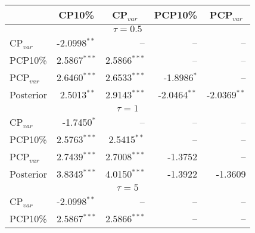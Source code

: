 { \renewcommand{\arraystretch}{1.2} 
\begin{table} 
\center 
\begin{tabular}{l | rrrr} 
& \multicolumn{1}{c}{CP10\%}& \multicolumn{1}{c}{CP$_{var}$}& \multicolumn{1}{c}{PCP10\%}& \multicolumn{1}{c}{PCP$_{var}$}\\ \hline 
\multicolumn{5}{c}{$\tau = 0.5$} \\ \hline 
CP$_{var}$ & -2.0998$^{**}$\phantom{$^{*}$} &    --\phantom{$^{***}$} &    --\phantom{$^{***}$} &    --\phantom{$^{***}$} \\ 
PCP10\% & 2.5867$^{***}$ & 2.5866$^{***}$ &    --\phantom{$^{***}$} &    --\phantom{$^{***}$}\\ 
PCP$_{var}$ & 2.6460$^{***}$ & 2.6533$^{***}$ & -1.8986$^{*}$\phantom{$^{**}$} &    --\phantom{$^{***}$} \\ 
Posterior & 2.5013$^{**}$\phantom{$^{*}$} & 2.9143$^{***}$ & -2.0464$^{**}$\phantom{$^{*}$} & -2.0369$^{**}$\phantom{$^{*}$}   \\ 
\hline  
\multicolumn{5}{c}{$\tau = 1$} \\ \hline 
CP$_{var}$ & -1.7450$^{*}$\phantom{$^{**}$} &    --\phantom{$^{***}$} &    --\phantom{$^{***}$} &    --\phantom{$^{***}$} \\ 
PCP10\% & 2.5763$^{***}$ & 2.5415$^{**}$\phantom{$^{*}$} &    --\phantom{$^{***}$} &    --\phantom{$^{***}$}   \\ 
PCP$_{var}$ & 2.7439$^{***}$ & 2.7008$^{***}$ & -1.3752\phantom{$^{***}$} &    --\phantom{$^{***}$} \\ 
Posterior  & 3.8343$^{***}$ & 4.0150$^{***}$ & -1.3922\phantom{$^{***}$} & -1.3609\phantom{$^{***}$}    \\ 
\hline 
\multicolumn{5}{c}{$\tau = 5$} \\ \hline 
CP$_{var}$ & -2.0998$^{**}$\phantom{$^{*}$} &    --\phantom{$^{***}$} &    --\phantom{$^{***}$} &    --\phantom{$^{***}$} \\ 
PCP10\% & 2.5867$^{***}$ & 2.5866$^{***}$ &    --\phantom{$^{***}$} &    --\phantom{$^{***}$}  \\ 

\end{tabular}
\end{table}}

